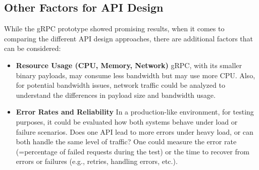 \subsection{Other Factors for API Design}

While the \ac{gRPC} prototype showed promising results, when it comes to comparing the different \ac{API} design approaches, there are additional factors that can be considered:

\begin{itemize}
    \item \textbf{Resource Usage (CPU, Memory, Network)}
    \ac{gRPC}, with its smaller binary payloads, may consume less bandwidth but may use more CPU. 
    Also, for potential bandwidth issues, network traffic could be analyzed to understand the differences in payload size and bandwidth usage.
    
    \item \textbf{Error Rates and Reliability}
    In a production-like environment, for testing purposes, it could be evaluated how both systems behave under load or failure scenarios. Does one \ac{API} lead to more errors under heavy load, or can both handle the same level of traffic? One could measure the error rate (=percentage of failed requests during the test) or the time to recover from errors or failures (e.g., retries, handling errors, etc.).
\end{itemize}

